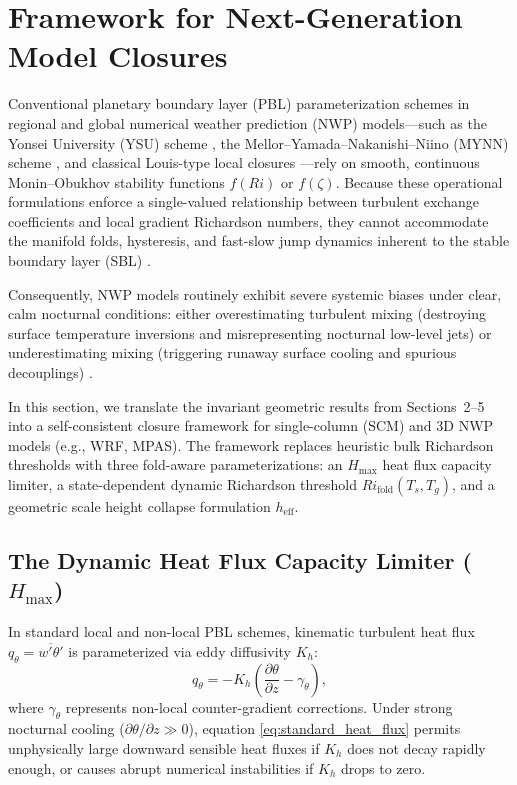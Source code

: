 \section{Framework for Next-Generation Model Closures}
\label{sec:closures}

Conventional planetary boundary layer (PBL) parameterization schemes in regional and global numerical weather prediction (NWP) models—such as the Yonsei University (YSU) scheme \citep{Hong2006}, the Mellor--Yamada--Nakanishi--Niino (MYNN) scheme \citep{Nakanishi2004}, and classical Louis-type local closures \citep{Louis1979}—rely on smooth, continuous Monin--Obukhov stability functions $f(Ri)$ or $f(\zeta)$. Because these operational formulations enforce a single-valued relationship between turbulent exchange coefficients and local gradient Richardson numbers, they cannot accommodate the manifold folds, hysteresis, and fast-slow jump dynamics inherent to the stable boundary layer (SBL) \citep{Holtslag2013, VanDeWiel2012}.

Consequently, NWP models routinely exhibit severe systemic biases under clear, calm nocturnal conditions: either overestimating turbulent mixing (destroying surface temperature inversions and misrepresenting nocturnal low-level jets) or underestimating mixing (triggering runaway surface cooling and spurious decouplings) \citep{Steeneveld2006, Mahrt2014}.

In this section, we translate the invariant geometric results from Sections~2--5 into a self-consistent closure framework for single-column (SCM) and 3D NWP models (e.g., WRF, MPAS). The framework replaces heuristic bulk Richardson thresholds with three fold-aware parameterizations: an $H_{\max}$ heat flux capacity limiter, a state-dependent dynamic Richardson threshold $Ri_{\mathrm{fold}}(T_s, T_g)$, and a geometric scale height collapse formulation $h_{\mathrm{eff}}$.

\subsection{The Dynamic Heat Flux Capacity Limiter ($H_{\max}$)}

In standard local and non-local PBL schemes, kinematic turbulent heat flux $q_\theta = \overline{w'\theta'}$ is parameterized via eddy diffusivity $K_h$:
\begin{equation}
q_\theta = -K_h \left( \frac{\partial \theta}{\partial z} - \gamma_\theta \right),
\label{eq:standard_heat_flux}
\end{equation}
where $\gamma_\theta$ represents non-local counter-gradient corrections. Under strong nocturnal cooling ($\partial \theta / \partial z \gg 0$), equation \eqref{eq:standard_heat_flux} permits unphysically large downward sensible heat fluxes if $K_h$ does not decay rapidly enough, or causes abrupt numerical instabilities if $K_h$ drops to zero.

